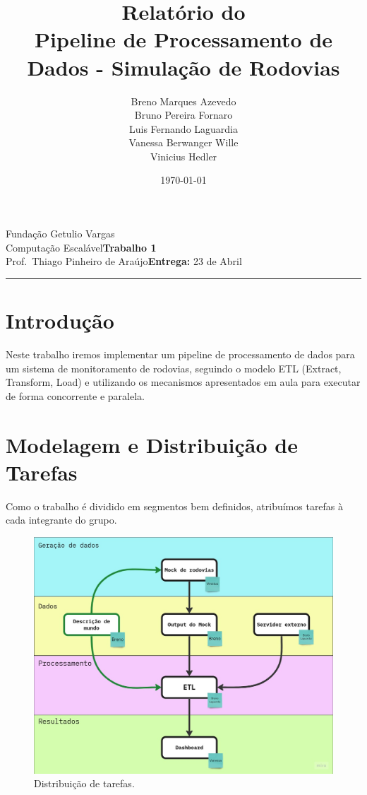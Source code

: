 \documentclass{article}
\title{
    Relatório do \assignment \\
    Pipeline de Processamento de Dados - Simulação de Rodovias
}
\author{
    Breno Marques Azevedo \\
    Bruno Pereira Fornaro \\
    Luis Fernando Laguardia \\
    Vanessa Berwanger Wille \\
    Vinicius Hedler
}
\date{\today}
\newcommand{\assignment}{Trabalho 1}
\newcommand{\duedate}{23 de Abril}
\begin{document}
    \noindent
    Fundação Getulio Vargas\hfill\\
    Computação Escalável\hfill\textbf{\assignment}\\
    Prof.\ Thiago Pinheiro de Araújo\hfill\textbf{Entrega:} \duedate\\
    \smallskip\hrule\bigskip

    {\let\newpage\relax\maketitle}
    \maketitle

    \section{Introdução}
    Neste trabalho iremos implementar um pipeline de processamento de dados
    para um sistema de monitoramento de rodovias, seguindo o modelo ETL 
    (Extract, Transform, Load) e utilizando os mecanismos apresentados
    em aula para executar de forma concorrente e paralela.

    \section{Modelagem e Distribuição de Tarefas}
    Como o trabalho é dividido em segmentos bem definidos, atribuímos tarefas
    à cada integrante do grupo.

    \begin{figure}[H]
        \centering
        \includegraphics*[width=12cm]{figs/modelagem.jpg}
        \caption{Distribuição de tarefas.}
        \label{fig:modelagem}
    \end{figure}
\end{document}
